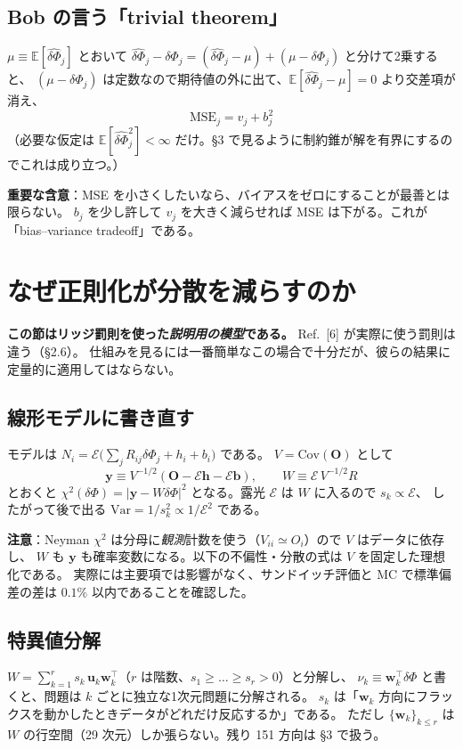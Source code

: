 \documentclass[11pt,a4paper]{ltjsarticle}
\newcommand{\dP}{\delta\Phi}
\newcommand{\dPh}{\widehat{\delta\Phi}}
\newcommand{\E}{\mathbb{E}}
\newcommand{\Var}{\mathrm{Var}}
\newcommand{\Cov}{\mathrm{Cov}}
\begin{document}
\subsection*{Bob の言う「trivial theorem」}
$\mu\equiv\E[\dPh_j]$ とおいて $\dPh_j-\dP_j=(\dPh_j-\mu)+(\mu-\dP_j)$ と分けて2乗すると、
$(\mu-\dP_j)$ は定数なので期待値の外に出て、$\E[\dPh_j-\mu]=0$ より交差項が消え、
\begin{equation}
\boxed{\ \mathrm{MSE}_j=v_j+b_j^2\ }
\end{equation}
（必要な仮定は $\E[\dPh_j^2]<\infty$ だけ。\S3 で見るように制約錐が解を有界にするのでこれは成り立つ。）

\textbf{重要な含意}：MSE を小さくしたいなら、バイアスをゼロにすることが最善とは限らない。
$b_j$ を少し許して $v_j$ を大きく減らせれば MSE は下がる。これが「bias--variance tradeoff」である。

\section{なぜ正則化が分散を減らすのか}

\textbf{この節はリッジ罰則を使った\emph{説明用の模型}である。} Ref.~[6] が実際に使う罰則は違う（\S2.6）。
仕組みを見るには一番簡単なこの場合で十分だが、彼らの結果に定量的に適用してはならない。

\subsection{線形モデルに書き直す}
モデルは $N_i=\mathcal{E}\big(\sum_j R_{ij}\dP_j+h_i+b_i\big)$ である。
$V=\Cov(\bm O)$ として
\begin{equation}
\bm y\equiv V^{-1/2}(\bm O-\mathcal{E}\bm h-\mathcal{E}\bm b),\qquad
W\equiv \mathcal{E}\,V^{-1/2}R
\end{equation}
とおくと $\chi^2(\dP)=|\bm y-W\dP|^2$ となる。露光 $\mathcal{E}$ は $W$ に入るので $s_k\propto\mathcal{E}$、
したがって後で出る $\Var=1/s_k^2\propto 1/\mathcal{E}^2$ である。

\textbf{注意}：Neyman $\chi^2$ は分母に\emph{観測}計数を使う（$V_{ii}\simeq O_i$）ので $V$ はデータに依存し、
$W$ も $\bm y$ も確率変数になる。以下の不偏性・分散の式は $V$ を固定した理想化である。
実際には主要項では影響がなく、サンドイッチ評価と MC で標準偏差の差は $0.1\%$ 以内であることを確認した。

\subsection{特異値分解}
$W=\sum_{k=1}^{r}s_k\,\bm u_k\bm w_k^{\!\top}$（$r$ は階数、$s_1\ge\dots\ge s_r>0$）と分解し、
$\nu_k\equiv\bm w_k^{\!\top}\dP$ と書くと、問題は $k$ ごとに独立な1次元問題に分解される。
$s_k$ は「$\bm w_k$ 方向にフラックスを動かしたときデータがどれだけ反応するか」である。
ただし $\{\bm w_k\}_{k\le r}$ は $W$ の行空間（29 次元）しか張らない。残り 151 方向は \S3 で扱う。
\end{document}
